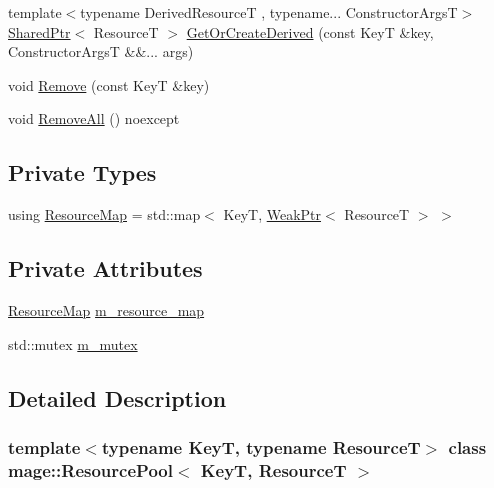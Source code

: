 \begin{DoxyCompactItemize}
\item 
{\footnotesize template$<$typename Derived\+ResourceT , typename... Constructor\+ArgsT$>$ }\\\mbox{\hyperlink{namespacemage_a1e01ae66713838a7a67d30e44c67703e}{Shared\+Ptr}}$<$ ResourceT $>$ \mbox{\hyperlink{classmage_1_1_resource_pool_a085ad24ca18ca375c04133ace21d3cc2}{Get\+Or\+Create\+Derived}} (const KeyT \&key, Constructor\+ArgsT \&\&... args)
\item 
void \mbox{\hyperlink{classmage_1_1_resource_pool_a58801a2c21f973e18b84277ddaa60d74}{Remove}} (const KeyT \&key)
\item 
void \mbox{\hyperlink{classmage_1_1_resource_pool_ab524641cccb1edbf761b94779b5ca5bc}{Remove\+All}} () noexcept
\end{DoxyCompactItemize}
\subsection*{Private Types}
\begin{DoxyCompactItemize}
\item 
using \mbox{\hyperlink{classmage_1_1_resource_pool_a7ae3cfa639bbc3696fa359673fed6153}{Resource\+Map}} = std\+::map$<$ KeyT, \mbox{\hyperlink{namespacemage_aa159a63c0d58464bdf32dfe419dd5dc1}{Weak\+Ptr}}$<$ ResourceT $>$ $>$
\end{DoxyCompactItemize}
\subsection*{Private Attributes}
\begin{DoxyCompactItemize}
\item 
\mbox{\hyperlink{classmage_1_1_resource_pool_a7ae3cfa639bbc3696fa359673fed6153}{Resource\+Map}} \mbox{\hyperlink{classmage_1_1_resource_pool_a5b72496aa427f783a6de90d8ee7ff2a5}{m\+\_\+resource\+\_\+map}}
\item 
std\+::mutex \mbox{\hyperlink{classmage_1_1_resource_pool_a3d6d7b0e2e9c3271f8ae3b7c2fa704ba}{m\+\_\+mutex}}
\end{DoxyCompactItemize}


\subsection{Detailed Description}
\subsubsection*{template$<$typename KeyT, typename ResourceT$>$\newline
class mage\+::\+Resource\+Pool$<$ Key\+T, Resource\+T $>$}

